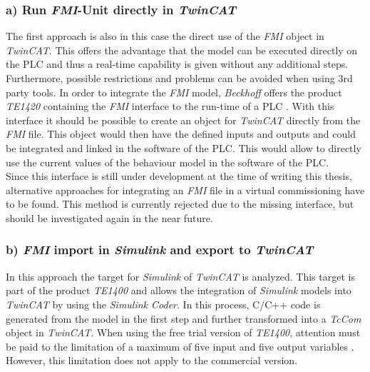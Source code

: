     
    
    
\subsubsection{a) Run \textit{FMI}-Unit directly in \textit{TwinCAT}}
    The first approach is also in this case the direct use of the \textit{FMI} object in \textit{TwinCAT}. This offers the advantage that the model can be executed directly on the PLC and thus a real-time capability is given without any additional steps. Furthermore, possible restrictions and problems can be avoided when using 3rd party tools. In order to integrate the \textit{FMI} model, \textit{Beckhoff} offers the product \textit{TE1420} containing the \textit{FMI} interface to the run-time of a PLC \cite{BeckhoffFmiProduct}. With this interface it should be possible to create an object for \textit{TwinCAT} directly from the \textit{FMI} file. This object would then have the defined inputs and outputs and could be integrated and linked in the software of the PLC. This would allow to directly use the current values of the behaviour model in the software of the PLC. \\ 
    
    Since this interface is still under development at the time of writing this thesis, alternative approaches for integrating an \textit{FMI} file in a virtual commissioning have to be found. This method is currently rejected due to the missing interface, but should be investigated again in the near future. 
    
\subsubsection{b) \textit{FMI} import in \textit{Simulink} and export to \textit{TwinCAT}}
    In this approach the target for \textit{Simulink} of \textit{TwinCAT} is analyzed. This target is part of the product \textit{TE1400} and allows the integration of \textit{Simulink} models into \textit{TwinCAT} by using the \textit{Simulink Coder}. In this process, C/C++ code is generated from the model in the first step and further transformed into a \textit{TcCom} object in \textit{TwinCAT}. When using the free trial version of \textit{TE1400}, attention must be paid to the limitation of a maximum of five input and five output variables \cite{TwincatManualTE1400}. However, this limitation does not apply to the commercial version. \\
    
